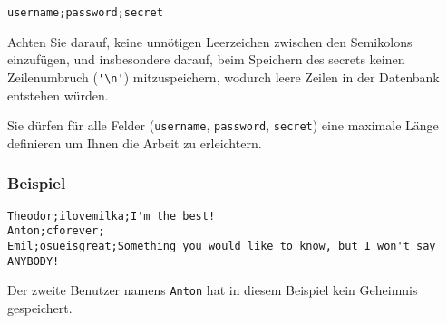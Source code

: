\begin{verbatim}
username;password;secret
\end{verbatim}

Achten Sie darauf, keine unnötigen Leerzeichen zwischen den Semikolons
einzufügen, und insbesondere darauf, beim Speichern des secrets keinen
Zeilenumbruch (\verb|'\n'|) mitzuspeichern, wodurch leere Zeilen in der
Datenbank entstehen würden.

Sie dürfen für alle Felder (\texttt{username}, \texttt{password},
\texttt{secret}) eine maximale Länge definieren um Ihnen die Arbeit zu
erleichtern.

\subsubsection*{Beispiel}

\begin{verbatim}
Theodor;ilovemilka;I'm the best!
Anton;cforever;
Emil;osueisgreat;Something you would like to know, but I won't say ANYBODY!
\end{verbatim}

Der zweite Benutzer namens \texttt{Anton} hat in diesem Beispiel kein Geheimnis
gespeichert.


\osueguidelinesthree


